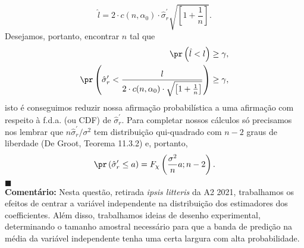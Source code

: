 {\begin{equation*}
 \hat{l} = 2 \cdot c(n, \alpha_0) \cdot \hat{\sigma}_r^\prime \sqrt{\left[ 1+ \frac{1}{n}\right]}.
\end{equation*}
Desejamos, portanto, encontrar $n$ tal que
\begin{align*}
 \pr\left(\hat{l} < l\right) &\geq \gamma,\\
 \pr\left( \hat{\sigma}_r^\prime < \frac{l}{2 \cdot c(n, \alpha_0) \cdot \sqrt{\left[ 1+ \frac{1}{n}\right]} }\right) &\geq \gamma,\\
\end{align*}
isto é conseguimos reduzir nossa afirmação probabilística a uma afirmação com respeito à f.d.a. (ou CDF) de $\hat{\sigma}_r^\prime$.
Para completar nossos cálculos só precisamos nos lembrar que $n  \hat{\sigma}_r^\prime/\sigma^2$ tem distribuição qui-quadrado com $n-2$ graus de liberdade (De Groot, Teorema 11.3.2) e, portanto,
\begin{equation*}
 \pr\left(\hat{\sigma}_r^\prime \leq a \right) = F_\chi\left(\frac{\sigma^2}{n}a; n- 2\right).
\end{equation*}
$\blacksquare$\\
\textbf{Comentário:} Nesta questão, retirada \textit{ipsis litteris} da A2 2021, trabalhamos os efeitos de centrar a variável independente na distribuição dos estimadores dos coefficientes.
Além disso, trabalhamos ideias de desenho experimental, determinando o tamanho amostral necessário para que a banda de predição na média da variável independente tenha uma certa largura com alta probabilidade.
}